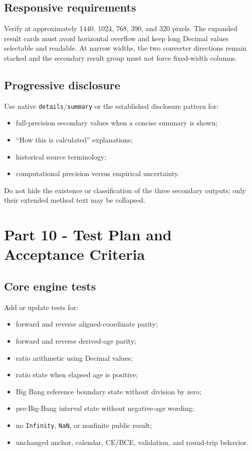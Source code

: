 \documentclass[11pt,letterpaper]{article}
\begin{document}
\subsection{Responsive requirements}

Verify at approximately 1440, 1024, 768, 390, and 320 pixels. The expanded
result cards must avoid horizontal overflow and keep long Decimal values
selectable and readable. At narrow widths, the two converter directions remain
stacked and the secondary result group must not force fixed-width columns.

\subsection{Progressive disclosure}

Use native \texttt{details}/\texttt{summary} or the established disclosure
pattern for:

\begin{itemize}
    \item full-precision secondary values when a concise summary is shown;
    \item ``How this is calculated'' explanations;
    \item historical source terminology;
    \item computational precision versus empirical uncertainty.
\end{itemize}

Do not hide the existence or classification of the three secondary outputs;
only their extended method text may be collapsed.

\section{Part 10 - Test Plan and Acceptance Criteria}

\subsection{Core engine tests}

Add or update tests for:

\begin{itemize}
    \item forward and reverse aligned-coordinate parity;
    \item forward and reverse derived-age parity;
    \item ratio arithmetic using Decimal values;
    \item ratio state when elapsed age is positive;
    \item Big Bang reference boundary state without division by zero;
    \item pre-Big-Bang interval state without negative-age wording;
    \item no \texttt{Infinity}, \texttt{NaN}, or nonfinite public result;
    \item unchanged anchor, calendar, CE/BCE, validation, and round-trip behavior.
\end{itemize}
\end{document}
